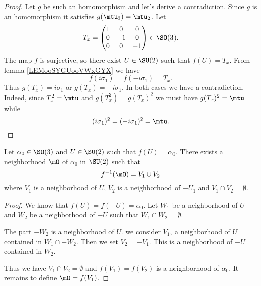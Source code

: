 \begin{proof}
	Let \( g\) be such an homomorphism and let's derive a contradiction. Since \( g\) is an homomorphism it satisfies \( g(\mtu_3)=\mtu_2\). Let
	\begin{equation}
		T_x=\begin{pmatrix}
			1 & 0  & 0  \\
			0 & -1 & 0  \\
			0 & 0  & -1
		\end{pmatrix}\in \SO(3).
	\end{equation}
	The map \( f\) is surjective, so there exist \( U\in \SU(2)\) such that \( f(U)=T_x\). From lemma \ref{LEMooSYGUooVWxGYX} we have
	\begin{equation}
		f(i\sigma_1)=f(-i\sigma_1)=T_x.
	\end{equation}
	Thus \( g(T_x)=i\sigma_1\) or \( g(T_x)=-i\sigma_1\). In both cases we have a contradiction. Indeed, since \( T_x^2=\mtu\) and \( g(T_x^2)=g(T_x)^2\) we must have \( g(T_x)^2=\mtu\) while
	\begin{equation}
		(i\sigma_1)^2=(-i\sigma_1)^2=\mtu.
	\end{equation}
\end{proof}

\begin{lemma}       \label{LEMooRCSSooTvAaJY}
	Let \( \alpha_0\in \SO(3)\) and \( U\in \SU(2)\) such that \( f(U)=\alpha_0\). There exists a neighborhood \(\mO\) of \( \alpha_0\) in \( \SU(2)\) such that
	\begin{equation}
		f^{-1}(\mO)=V_1\cup V_2
	\end{equation}
	where \( V_1\) is a neighborhood of \( U\), \( V_2\) is a neighborhood of \( -U_1\) and \( V_1\cap V_2=\emptyset\).
\end{lemma}

\begin{proof}
	We know that \( f(U)=f(-U)=\alpha_0\). Let \( W_1\) be a neighborhood of \( U\) and \( W_2\) be a neighborhood of \( -U\) such that \( W_1\cap W_2=\emptyset\).

	The part \( -W_2\) is a neighborhood of \( U\). we consider \( V_1\), a neighborhood of \( U\) contained in \( W_1\cap -W_2\). Then we set \( V_2=-V_1\). This is a neighborhood of \(-U\) contained in \( W_2\).

	Thus we have \( V_1\cap V_2=\emptyset\) and \( f(V_1)=f(V_2)\) is a neighborhood of \( \alpha_0\). It remains to define \( \mO=f(V_1)\).
\end{proof}

